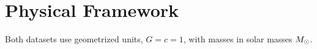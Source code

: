 \section{Physical Framework}
\label{sec:physical-framework}

Both datasets use geometrized units, $G = c = 1$, with masses in solar masses $M_\odot$.






